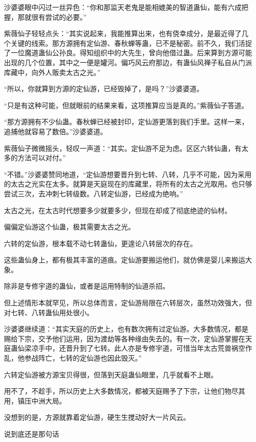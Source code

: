 \begin{this_body}
沙婆婆眼中闪过一丝异色：“你和那监天老鬼是能相媲美的智道蛊仙，能有六成把握，那就很有尝试的必要。”

紫薇仙子轻轻点头：“其实说起来，我能推算出来，也有侥幸成分，是最近得了几个关键的线索。那方源拥有定仙游、春秋蝉等蛊，已不是秘密。前不久，我们活捉了一位魔道蛊仙公孙良。得知组织中的大先生，曾向他借过蛊。后来算到方源可能出现的几个位置，其中之一便是罐河。偏巧风云府那边，有蛊仙风禅子私自从门派库藏中，向外人贩卖太古之光。”

“所以，你就算到方源的定仙游，已经毁掉了，是吗？”沙婆婆道。

“只是有这种可能，但就眼前的结果来看，这项推算应当是真的。”紫薇仙子答道。

“那方源拥有不少仙蛊。春秋蝉已经被封印，定仙游更落到我们手里。这样一来，追捕他就容易了数倍。”沙婆婆道。

紫薇仙子微微摇头，轻叹一声道：“其实。定仙游不足为虑。区区六转仙蛊，有太多的方法可以对付。”

“不错。”沙婆婆赞同地道，“定仙游想要晋升到七转、八转，几乎不可能，因为采用的太古之光实在太多。就算是天庭现在的库藏里，将所有的太古之光取用。也只够尝试三次，去冲刺七转级数。八转定仙游，已经成为绝响。”

太古之光，在太古时代想要多少就要多少，但现在却成了彻底绝迹的仙材。

偏偏定仙游这个仙蛊，极其需要太古之光。

六转的定仙游，根本载不动七转蛊仙，更遑论八转层次的存在。

这些蛊仙身上，都有极其丰富的道痕。定仙游要搬运他们，就仿佛是婴儿来搬运大象。

除非是专修宇道的蛊仙，或者是运用特制的仙道杀招。

但上述情形本就罕见，所以总体而言，定仙游局限在六转层次，虽然功效强大，但对七转、八转蛊仙用处很小。

沙婆婆继续道：“其实天庭的历史上，也有数次拥有过定仙游。大多数情况，都是赐给下宗，交予他们运用，因为渡劫等各种缘由失去的。有一次，定仙游掌握在天庭蛊仙梁凉手中，还晋升到了七转。此人亦是专修宇道，可惜当年太古荒兽祸空作乱，他参战阵亡，七转的定仙游也因此毁灭。”

六转定仙游被方源宝贝得很，但落到天庭蛊仙眼里，几乎就看不上眼。

用不了，不趁手，所以历史上大多数情况，都被天庭赐予了下宗，让他们物尽其用，镇压中洲大局。

没想到的是，方源就靠着定仙游，硬生生搅动好大一片风云。

说到底还是那句话


\end{this_body}
